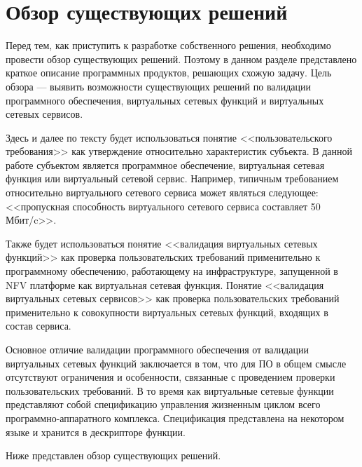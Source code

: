 \documentclass[oneside,final,14pt,a4paper]{extreport}
\begin{document}
\chapter{Обзор существующих решений}
\label{chap:review-existed-solutions}
Перед тем, как приступить к разработке собственного решения, необходимо провести обзор существующих решений. Поэтому в данном разделе представлено краткое описание программных продуктов, решающих схожую задачу. Цель обзора --- выявить возможности существующих решений по валидации программного  обеспечения, виртуальных сетевых функций и виртуальных сетевых сервисов.

Здесь и далее по тексту будет использоваться понятие <<пользовательского требования>> как утверждение относительно характеристик субъекта. В данной работе субъектом является программное обеспечение, виртуальная сетевая функция или виртуальный сетевой сервис. Например, типичным требованием относительно виртуального сетевого сервиса может являться следующее: <<пропускная способность виртуального сетевого сервиса составляет 50 Мбит/c>>.

Также будет использоваться понятие <<валидация виртуальных сетевых функций>> как проверка пользовательских требований применительно к программному обеспечению, работающему на инфраструктуре, запущенной в NFV платформе как виртуальная сетевая функция. Понятие <<валидация виртуальных сетевых сервисов>> как проверка пользовательских требований применительно к совокупности виртуальных сетевых функций, входящих в состав сервиса.

Основное отличие валидации программного обеспечения от валидации виртуальных сетевых функций заключается в том, что для ПО в общем смысле отсутствуют ограничения и особенности, связанные с проведением проверки пользовательских требований. В то время как виртуальные сетевые функции представляют собой спецификацию управления жизненным циклом всего программно-аппаратного комплекса. Спецификация представлена на некотором языке и хранится в дескрипторе функции.

Ниже представлен обзор существующих решений.
\end{document}

